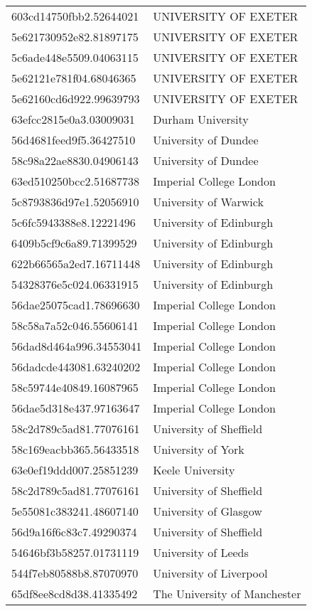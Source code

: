 \begin{tabular}{ll}
603cd14750fbb2.52644021 & UNIVERSITY OF EXETER \\
5e621730952e82.81897175 & UNIVERSITY OF EXETER \\
5c6ade448e5509.04063115 & UNIVERSITY OF EXETER \\
5e62121e781f04.68046365 & UNIVERSITY OF EXETER \\
5e62160cd6d922.99639793 & UNIVERSITY OF EXETER \\
63efcc2815e0a3.03009031 & Durham University \\
56d4681feed9f5.36427510 & University of Dundee \\
58c98a22ae8830.04906143 & University of Dundee \\
63ed510250bcc2.51687738 & Imperial College London \\
5c8793836d97e1.52056910 & University of Warwick \\
5c6fc5943388e8.12221496 & University of Edinburgh \\
6409b5cf9c6a89.71399529 & University of Edinburgh \\
622b66565a2ed7.16711448 & University of Edinburgh \\
54328376e5c024.06331915 & University of Edinburgh \\
56dae25075cad1.78696630 & Imperial College London \\
58c58a7a52c046.55606141 & Imperial College London \\
56dad8d464a996.34553041 & Imperial College London \\
56dadcde443081.63240202 & Imperial College London \\
58c59744e40849.16087965 & Imperial College London \\
56dae5d318e437.97163647 & Imperial College London \\
58c2d789c5ad81.77076161 & University of Sheffield \\
58c169eacbb365.56433518 & University of York \\
63e0ef19ddd007.25851239 & Keele University \\
58c2d789c5ad81.77076161 & University of Sheffield \\
5e55081c383241.48607140 & University of Glasgow \\
56d9a16f6c83c7.49290374 & University of Sheffield \\
54646bf3b58257.01731119 & University of Leeds \\
544f7eb80588b8.87070970 & University of Liverpool \\
65df8ee8cd8d38.41335492 & The University of Manchester \\

\end{tabular}
